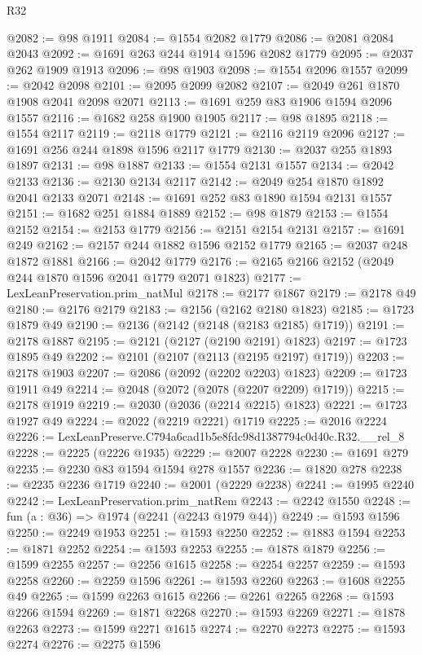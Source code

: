 \begin{lexlean}{R32}
\begin{coremodule}
@2082 := @98 @1911
@2084 := @1554 @2082 @1779
@2086 := @2081 @2084 @2043
@2092 := @1691 @263 @244 @1914 @1596 @2082 @1779
@2095 := @2037 @262 @1909 @1913
@2096 := @98 @1903
@2098 := @1554 @2096 @1557
@2099 := @2042 @2098
@2101 := @2095 @2099 @2082
@2107 := @2049 @261 @1870 @1908 @2041 @2098 @2071
@2113 := @1691 @259 @83 @1906 @1594 @2096 @1557
@2116 := @1682 @258 @1900 @1905
@2117 := @98 @1895
@2118 := @1554 @2117
@2119 := @2118 @1779
@2121 := @2116 @2119 @2096
@2127 := @1691 @256 @244 @1898 @1596 @2117 @1779
@2130 := @2037 @255 @1893 @1897
@2131 := @98 @1887
@2133 := @1554 @2131 @1557
@2134 := @2042 @2133
@2136 := @2130 @2134 @2117
@2142 := @2049 @254 @1870 @1892 @2041 @2133 @2071
@2148 := @1691 @252 @83 @1890 @1594 @2131 @1557
@2151 := @1682 @251 @1884 @1889
@2152 := @98 @1879
@2153 := @1554 @2152
@2154 := @2153 @1779
@2156 := @2151 @2154 @2131
@2157 := @1691 @249
@2162 := @2157 @244 @1882 @1596 @2152 @1779
@2165 := @2037 @248 @1872 @1881
@2166 := @2042 @1779
@2176 := @2165 @2166 @2152 (@2049 @244 @1870 @1596 @2041 @1779 @2071 @1823)
@2177 := LexLeanPreservation.prim_natMul
@2178 := @2177 @1867
@2179 := @2178 @49
@2180 := @2176 @2179
@2183 := @2156 (@2162 @2180 @1823)
@2185 := @1723 @1879 @49
@2190 := @2136 (@2142 (@2148 (@2183 @2185) @1719))
@2191 := @2178 @1887
@2195 := @2121 (@2127 (@2190 @2191) @1823)
@2197 := @1723 @1895 @49
@2202 := @2101 (@2107 (@2113 (@2195 @2197) @1719))
@2203 := @2178 @1903
@2207 := @2086 (@2092 (@2202 @2203) @1823)
@2209 := @1723 @1911 @49
@2214 := @2048 (@2072 (@2078 (@2207 @2209) @1719))
@2215 := @2178 @1919
@2219 := @2030 (@2036 (@2214 @2215) @1823)
@2221 := @1723 @1927 @49
@2224 := @2022 (@2219 @2221) @1719
@2225 := @2016 @2224
@2226 := LexLeanPreserve.C794a6cad1b5e8fdc98d1387794c0d40c.R32.__rel_8
@2228 := @2225 (@2226 @1935)
@2229 := @2007 @2228
@2230 := @1691 @279
@2235 := @2230 @83 @1594 @1594 @278 @1557
@2236 := @1820 @278
@2238 := @2235 @2236 @1719
@2240 := @2001 (@2229 @2238)
@2241 := @1995 @2240
@2242 := LexLeanPreservation.prim_natRem
@2243 := @2242 @1550
@2248 := fun (a : @36) => @1974 (@2241 (@2243 @1979 @44))
@2249 := @1593 @1596
@2250 := @2249 @1953
@2251 := @1593 @2250
@2252 := @1883 @1594
@2253 := @1871 @2252
@2254 := @1593 @2253
@2255 := @1878 @1879
@2256 := @1599 @2255
@2257 := @2256 @1615
@2258 := @2254 @2257
@2259 := @1593 @2258
@2260 := @2259 @1596
@2261 := @1593 @2260
@2263 := @1608 @2255 @49
@2265 := @1599 @2263 @1615
@2266 := @2261 @2265
@2268 := @1593 @2266 @1594
@2269 := @1871 @2268
@2270 := @1593 @2269
@2271 := @1878 @2263
@2273 := @1599 @2271 @1615
@2274 := @2270 @2273
@2275 := @1593 @2274
@2276 := @2275 @1596

\end{coremodule}
\end{lexlean}
